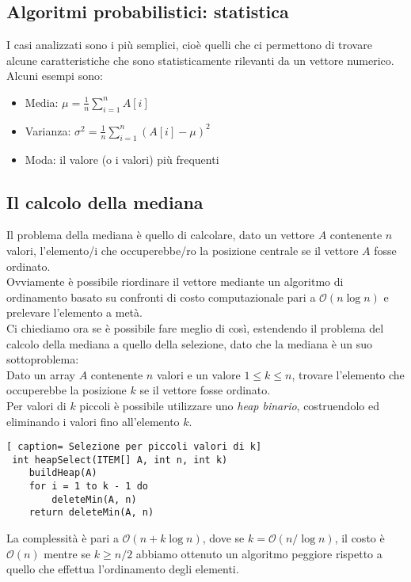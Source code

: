 \documentclass[../cheatSheetAlgoritmi.tex]{subfiles}
\begin{document}
\subsection{Algoritmi probabilistici: statistica}
I casi analizzati sono i più semplici, cioè quelli che ci permettono di trovare alcune caratteristiche che sono statisticamente rilevanti da un vettore numerico. \\
Alcuni esempi sono:
\begin{itemize}
	\item Media: $\mu = \frac{1}{n} \sum_{i = 1}^{n} A[i]$
	\item Varianza: $\sigma^2 = \frac{1}{n} \sum_{i = 1}^{n} (A[i] - \mu)^2$
	\item Moda: il valore (o i valori) più frequenti
\end{itemize} 
\subsection{Il calcolo della mediana}
Il problema della mediana è quello di calcolare, dato un vettore $A$ contenente $n$ valori, l'elemento/i che occuperebbe/ro la posizione centrale se il vettore $A$ fosse ordinato. \\
Ovviamente è possibile riordinare il vettore mediante un algoritmo di ordinamento basato su confronti di costo computazionale pari a $\mathcal{O}(n \log n)$ e prelevare l'elemento a metà. \\
Ci chiediamo ora se è possibile fare meglio di così, estendendo il problema del calcolo della mediana a quello della selezione, dato che la mediana è un suo sottoproblema: \\
Dato un array $A$ contenente $n$ valori e un valore $1 \leq k \leq n$, trovare l'elemento che occuperebbe la posizione $k$ se il vettore fosse ordinato. \\
Per valori di $k$ piccoli è possibile utilizzare uno \emph{heap binario}, costruendolo ed eliminando i valori fino all'elemento $k$.
 \begin{lstlisting}[ caption= Selezione per piccoli valori di k]
 int heapSelect(ITEM[] A, int n, int k)
	buildHeap(A)
	for i = 1 to k - 1 do
		deleteMin(A, n)
	return deleteMin(A, n) 	
\end{lstlisting}
La complessità è pari a $\mathcal{O}(n + k \log n)$, dove se $k = \mathcal{O}(n / \log n)$, il costo è $\mathcal{O}(n)$ mentre se $k \geq n/2$ abbiamo ottenuto un algoritmo peggiore rispetto a quello che effettua l'ordinamento degli elementi. \\
\end{document}
